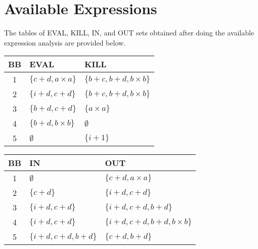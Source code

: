 \section{Available Expressions}

The tables of EVAL, KILL, IN, and OUT sets obtained after doing the available expression analysis are provided below. 

\begin{table}[!ht]
\centering
\begin{tabular}{|c|l|l|}
\hline
\textbf{BB} & \textbf{EVAL} & \textbf{KILL}\\
\hline
1 & $\{c+d,a \times a\}$ & $\{b+c,b+d,b \times b\}$ \\
\hline
2 & $\{i+d,c+d\}$ & $\{b+c,b+d,b \times b\}$ \\
\hline
3 & $\{b+d,c+d\}$ & $\{a \times a\}$ \\
\hline
4 & $\{b+d,b \times b\}$ & $\emptyset$ \\
\hline
5 & $\emptyset$ & $\{i+1\}$ \\
\hline
\end{tabular}
\end{table}

\begin{table}[!ht]
\centering
\begin{tabular}{|c|l|l|}
\hline
\textbf{BB} & \textbf{IN} & \textbf{OUT}\\
\hline
1 & $\emptyset$ & $\{c+d,a \times a\}$ \\
\hline
2 & $\{c+d\}$ & $\{i+d,c+d\}$ \\
\hline
3 & $\{i+d,c+d\}$ & $\{i+d,c+d,b+d\}$ \\
\hline
4 & $\{i+d,c+d\}$ & $\{i+d,c+d,b+d,b \times b\}$ \\
\hline
5 & $\{i+d,c+d,b+d\}$ & $\{c+d,b+d\}$ \\
\hline
\end{tabular}
\end{table}
